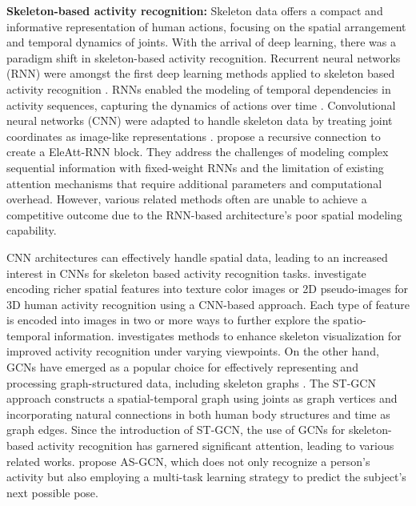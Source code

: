 \textbf{Skeleton-based activity recognition:} Skeleton data offers a compact and informative representation of human actions, focusing on the spatial arrangement and temporal dynamics of joints.
With the arrival of deep learning, there was a paradigm shift in skeleton-based activity recognition. Recurrent neural networks (RNN) were amongst the first deep learning methods applied to skeleton based activity recognition \cite{baccouche2011sequential}. RNNs enabled the modeling of temporal dependencies in activity sequences, capturing the dynamics of actions over time \cite{song2017endtoend, wang2017modeling}. Convolutional neural networks (CNN) were adapted to handle skeleton data by treating joint coordinates as image-like representations \cite{du2015skeleton, zhang2019view}. \textcite{zhang2018adding} propose a recursive connection to create a EleAtt-RNN block. They address the challenges of modeling complex sequential information with fixed-weight RNNs and the limitation of existing attention mechanisms that require additional parameters and computational overhead. However, various related methods \cite{wu2014leveraging, zhao2017two} often are unable to achieve a competitive outcome due to the RNN-based architecture’s poor spatial modeling capability.

CNN architectures can effectively handle spatial data, leading to an increased interest in CNNs for skeleton based activity recognition tasks. \textcite{ding2017investigation} investigate encoding richer spatial features into texture color images or 2D pseudo-images for 3D human activity recognition using a CNN-based approach. Each type of feature is encoded into images in two or more ways to further explore the spatio-temporal information. \textcite{liu2017enhanced} investigates methods to enhance skeleton visualization for improved activity recognition under varying viewpoints. On the other hand, GCNs have emerged as a popular choice for effectively representing and processing graph-structured data, including skeleton graphs \cite{shi2019two, cheng2020skeleton, martin_dynamic_2020}. The ST-GCN approach constructs a spatial-temporal graph using joints as graph vertices and incorporating natural connections in both human body structures and time as graph edges.
Since the introduction of ST-GCN, the use of GCNs for skeleton-based activity recognition has garnered significant attention, leading to various related works. \textcite{li2019actional} propose AS-GCN, which does not only recognize a person’s activity but also employing a multi-task learning strategy to predict the subject’s next possible pose.


